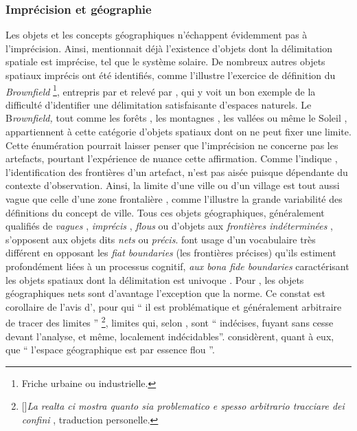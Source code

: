 \subsubsection{Imprécision et géographie}

Les objets et les concepts géographiques n’échappent évidemment pas à
l’imprécision. Ainsi, \textcite{Russell1923} mentionnait déjà
l’existence d’objets dont la délimitation spatiale est imprécise, tel
que le système solaire. De nombreux autres objets spatiaux imprécis
ont été identifiés, comme l’illustre l’exercice de définition du
\emph{Brownfield} \footnote{Friche urbaine ou industrielle.},
entrepris par \textcite{Alker2000} et relevé par
\textcite{Bennett2001}, qui y voit un bon exemple de la difficulté
d’identifier une délimitation satisfaisante d’espaces naturels. Le
B\emph{rownfield,} tout comme les forêts
\autocite{Bennett2001,Dilo2006,Fisher2006}, les montagnes
\autocite{Varzi2001,Varzi2015,Fisher2006,Chaudhry2008}, les vallées
\autocite{Schneider2003} ou même le Soleil \autocite{Simons1999},
appartiennent à cette catégorie d’objets spatiaux dont on ne peut
fixer une limite. Cette énumération pourrait laisser penser que
l’imprécision ne concerne pas les artefacts, pourtant l’expérience de
\textcite{Perec1974} nuance cette affirmation. Comme l’indique
\textcite{Campari1996}, l’identification des frontières d’un artefact,
n’est pas aisée puisque dépendante du contexte d’observation. Ainsi,
la limite d’une ville ou d’un village est tout aussi vague que celle
d’une zone frontalière \autocite{Varzi2001, Fisher2006}, comme
l’illustre la grande variabilité des définitions du concept de ville.
Tous ces objets géographiques, généralement qualifiés de \emph{vagues}
\autocite{Erwig1997}, \emph{imprécis} \autocite{Winter2000},
\emph{flous} \autocite{Lagacherie1996} ou d’objets aux
\emph{frontières indéterminées} \autocite{Burrough1996}, s’opposent
aux objets dits \emph{nets} \autocite{Schneider2001} ou
\emph{précis}. \textcite{Smith1995, Smith1997, Smith2000} font usage
d’un vocabulaire très différent en opposant les \emph{fiat boundaries}
(\ie les frontières précises) qu’ils estiment profondément liées à un
processus cognitif, \emph{aux bona fide boundaries} caractérisant les
objets spatiaux dont la délimitation est univoque
\autocite{Varzi2015}. Pour \textcite{Couclelis1996}, les objets
géographiques nets sont d’avantage l’exception que la norme. Ce
constat est corollaire de l’avis d’\textcite[200]{OddAmbrosetti1987},
pour qui \enquote{\textelp{} il est problématique et généralement
  arbitraire de tracer des limites \textelp{}}
\footnote{[{\cite[200]{OddAmbrosetti1987}}]{\emph{La
      realta ci mostra quanto sia problematico e spesso arbitrario
      tracciare dei confini \textelp{}}}, traduction personelle.},
limites qui, selon \textcite[106]{Brunet2001}, sont
\enquote{\textelp{} indécises, fuyant sans cesse devant l’analyse, et
  même, localement indécidables}. \textcite{Dutozia2014} considèrent,
quant à eux, que \enquote{\textelp{} l’espace géographique est par
  essence flou \textelp{}}.

